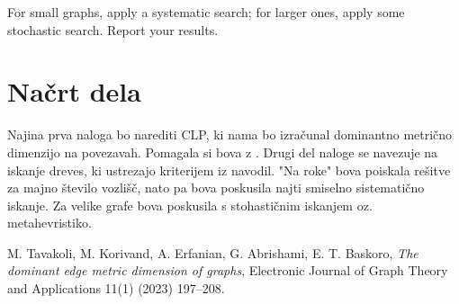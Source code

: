 \documentclass[a4paper,12pt]{article}
\begin{document}
    For small graphs, apply a systematic search; for larger ones, apply some stochastic search. Report your results.

\section{Načrt dela}
    Najina prva naloga bo narediti CLP, ki nama bo izračunal dominantno metrično dimenzijo na povezavah. Pomagala si bova z \cite{dominantedge}. Drugi del naloge se navezuje na iskanje dreves, ki ustrezajo kriterijem iz navodil. "Na roke" bova poiskala rešitve za majno število vozlišč, nato pa bova poskusila najti smiselno sistematično iskanje. Za velike grafe bova poskusila s stohastičnim iskanjem oz. metahevristiko.



    \begin{thebibliography}{99}
        M. Tavakoli, M. Korivand, A. Erfanian, G. Abrishami, E. T. Baskoro,
        \emph{The dominant edge metric dimension of graphs},
        Electronic Journal of Graph Theory and Applications 11(1) (2023) 197–208.  
    \end{thebibliography}
\end{document}
